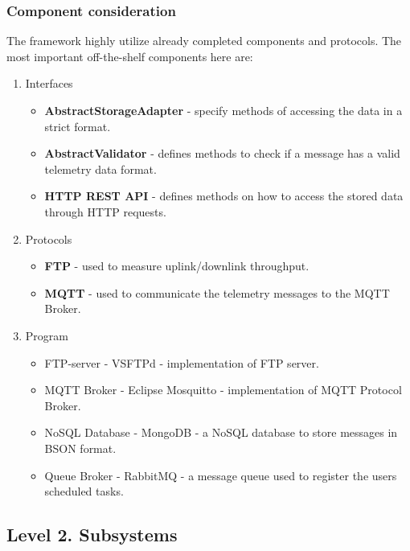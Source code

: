 \hypertarget{component-consideration}{%
\subsubsection{Component consideration}\label{component-consideration}}

The framework highly utilize already completed components and protocols.
The most important off-the-shelf components here are:

\begin{enumerate}
\def\labelenumi{\arabic{enumi}.}
\tightlist
\item
  Interfaces

  \begin{itemize}
  \tightlist
  \item
    \textbf{AbstractStorageAdapter} - specify methods of accessing the
    data in a strict format.
  \item
    \textbf{AbstractValidator} - defines methods to check if a message
    has a valid telemetry data format.
  \item
    \textbf{HTTP REST API} - defines methods on how to access the stored
    data through HTTP requests.
  \end{itemize}
\item
  Protocols

  \begin{itemize}
  \tightlist
  \item
    \textbf{FTP} - used to measure uplink/downlink throughput.
  \item
    \textbf{MQTT} - used to communicate the telemetry messages to the
    MQTT Broker.
  \end{itemize}
\item
  Program

  \begin{itemize}
  \tightlist
  \item
    FTP-server - VSFTPd - implementation of FTP server.
  \item
    MQTT Broker - Eclipse Mosquitto - implementation of MQTT Protocol
    Broker.
  \item
    NoSQL Database - MongoDB - a NoSQL database to store messages in
    BSON format.
  \item
    Queue Broker - RabbitMQ - a message queue used to register the users
    scheduled tasks.
  \end{itemize}
\end{enumerate}

\hypertarget{level-2.-subsystems}{%
\subsection{Level 2. Subsystems}\label{level-2.-subsystems}}


